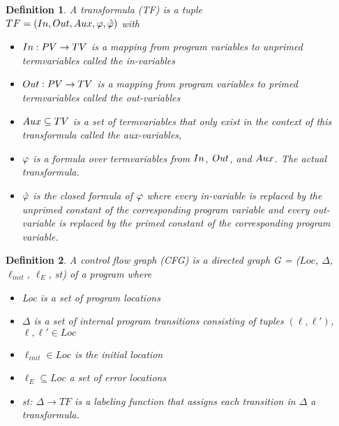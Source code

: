 \documentclass{article}
\newtheorem{mydef}{Definition}
\begin{document}
    \begin{mydef}
        A transformula (TF) is a tuple \\ $TF = (In, Out, Aux, \varphi, \hat{\varphi})$ with 
        \begin{itemize}
          \item $In : PV \rightarrow TV$ is a mapping from program variables to unprimed termvariables called the in-variables
          \item $Out : PV \rightarrow TV$ is a mapping from program variables to primed termvariables called the out-variables
          \item $Aux \subseteq TV$ is a set of termvariables that only exist in the context of this transformula called the aux-variables,
          \item $\varphi$ is a formula over termvariables from $In$, $Out$, and $Aux$. The actual transformula.
          \item $\hat{\varphi}$ is the closed formula of $\varphi$ where every in-variable is replaced by the unprimed constant of the corresponding program variable and every out-variable is replaced by the primed constant of the corresponding program variable.
        \end{itemize}
    \end{mydef}

	\begin{mydef}
		A control flow graph (CFG) is a directed graph G = ($Loc$, $\Delta$, $\ell_{init}$, $\ell_E$, st) of a program where
		\begin{itemize}
			\item  Loc is a set of program locations
			\item $\Delta$ is a set of internal program transitions consisting of tuples $(\ell, \ell')$, $\ell, \ell' \in Loc$
			\item $\ell_{init} \in Loc$ is the initial location
			\item $\ell_E \subseteq Loc$ a set of error locations
			\item st: $\Delta \rightarrow TF$ is a labeling function that assigns each transition in $\Delta$ a transformula.
		\end{itemize}
	\end{mydef} \noindent
	 \bigskip
\end{document}
